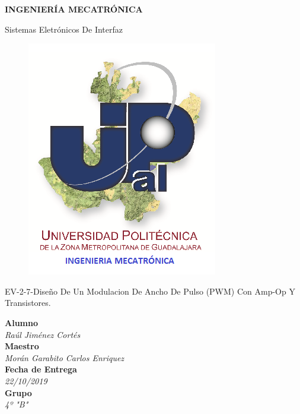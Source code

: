 \documentclass[10pt,a4paper]{article}
\author{Jiménez Cortés Raúl}
\begin{document}
\begin{center}
\begin{LARGE}
\textbf{INGENIERÍA MECATRÓNICA}\\
\end{LARGE}
{\large Sistemas Eletrónicos De Interfaz}\\
\begin{figure}[hbtp]
\centering
\includegraphics[scale=0.80]{UPZMG_Mecatr_nica.png}
\end{figure} 
\begin{center}
\begin{LARGE}
EV-2-7-Diseño De Un Modulacion De Ancho De Pulso (PWM) Con Amp-Op Y Transistores.
\end{LARGE}
\end{center}

\begin{Large}
\textbf{Alumno}
\\\textit{Raúl Jiménez Cortés}
\textbf{\\Maestro}
\\\textit{Morán Garabito Carlos Enriquez}
\textbf{\\Fecha de Entrega}
\\\textit{22/10/2019}
\textbf{\\Grupo}
\\\textit{4º "B"}
\end{Large}
\end{center}

\newpage
\end{document}
